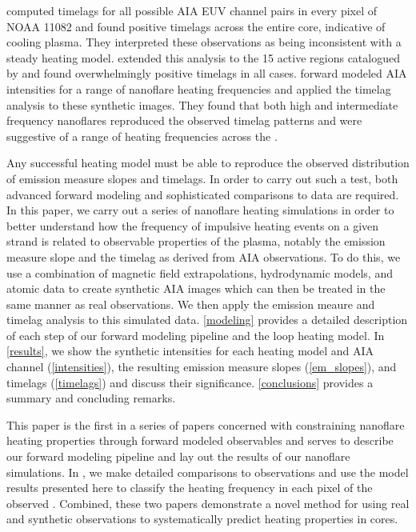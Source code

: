 \citeauthor{viall_evidence_2012} computed timelags for all possible AIA EUV channel pairs in every pixel of \AR{} NOAA 11082 and found positive timelags across the entire \AR{} core, indicative of cooling plasma. They interpreted these observations as being inconsistent with a steady heating model. \citet{viall_survey_2017} extended this analysis to the 15 active regions catalogued by \citet{warren_systematic_2012} and found overwhelmingly positive timelags in all cases. \citet{bradshaw_patterns_2016} forward modeled AIA intensities for a range of nanoflare heating frequencies and applied the timelag analysis to these synthetic images. They found that both high and intermediate frequency nanoflares reproduced the observed timelag patterns and were suggestive of a range of heating frequencies across the \AR{}.

Any successful heating model must be able to reproduce the observed distribution of emission measure slopes and timelags. In order to carry out such a test, both advanced forward modeling and sophisticated comparisons to data are required. In this paper, we carry out a series of nanoflare heating simulations in order to better understand how the frequency of impulsive heating events on a given strand is related to observable properties of the plasma, notably the emission measure slope and the timelag as derived from AIA observations. To do this, we use a combination of magnetic field extrapolations, hydrodynamic models, and atomic data to create synthetic AIA images which can then be treated in the same manner as real observations. We then apply the emission meaure and timelag analysis to this simulated data. \autoref{modeling} provides a detailed description of each step of our forward modeling pipeline and the loop heating model. In \autoref{results}, we show the synthetic intensities for each heating model and AIA channel (\autoref{intensities}), the resulting emission measure slopes (\autoref{em_slopes}), and timelags (\autoref{timelags}) and discuss their significance. \autoref{conclusions} provides a summary and concluding remarks.

This paper is the first in a series of papers concerned with constraining nanoflare heating properties through forward modeled observables and serves to describe our forward modeling pipeline and lay out the results of our nanoflare simulations. In \citet[ hereafter]{barnes_understanding_2018-1}, we make detailed comparisons to observations and use the model results presented here to classify the heating frequency in each pixel of the observed \AR{}. Combined, these two papers demonstrate a novel method for using real and synthetic observations to systematically predict heating properties in \AR{} cores.
